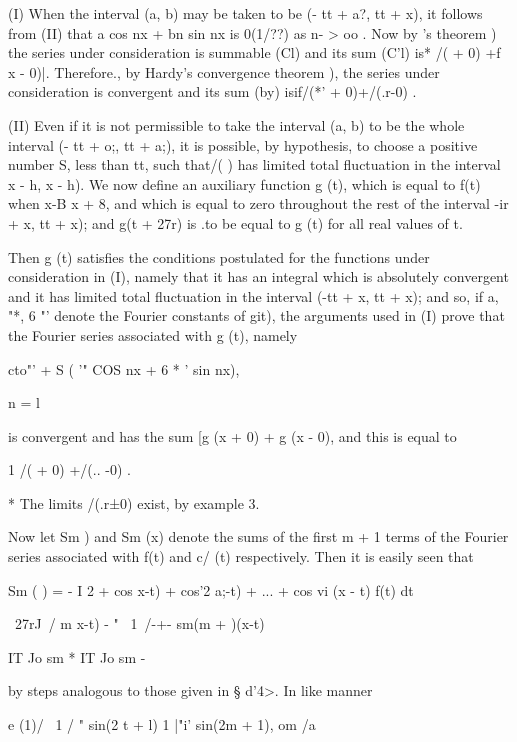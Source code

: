 (I) When the interval (a, b) may be taken to be (- tt + a?, tt + x),
it follows from (II) that a cos nx + bn sin nx is 0(1/??) as n-
> oo . Now by \Fejer's theorem ) the series under consideration
is summable (Cl) and its sum (C'l) is* /( + 0) +f x - 0)|. Therefore.,
by Hardy's convergence theorem ), the series under consideration
is convergent and its sum (by) isif/(*' + 0)+/(.r-0) .

(II) Even if it is not permissible to take the interval (a, b) to be
the whole interval (- tt + o;, tt + a;), it is possible, by
hypothesis, to choose a positive number S, less than tt, such that/( )
has limited total fluctuation in the interval x - h, x - h). We now
define an auxiliary function g (t), which is equal to f(t) when x-B%
x + 8, and which is equal to zero throughout the rest of the interval
-ir + x, tt + x); and g(t + 27r) is .to be equal to g (t) for all real
values of t.

Then g (t) satisfies the conditions postulated for the functions under
consideration in (I), namely that it has an integral which is
absolutely convergent and it has limited total fluctuation in the
interval (-tt + x, tt + x); and so, if a, "*, 6 "' denote the Fourier
constants of git), the arguments used in (I) prove that the Fourier
series associated with g (t), namely

  cto"' + S ( '" COS nx + 6 * ' sin nx),

n = l

is convergent and has the sum [g (x + 0) + g (x - 0), and this is
equal to

1 /( + 0) +/(.. -0) .

* The limits /(.r±0) exist, by example 3.

%
%

Now let Sm ) and Sm (x) denote the sums of the first m + 1 terms of
the Fourier series associated with f(t) and c/ (t) respectively. Then
it is easily seen that

Sm ( ) = - I 2 + cos x-t) + cos'2 a;-t) + ... + cos vi (x - t) f(t) dt

~27rJ\ / m x-t) - " \ 1\ /-+- sm(m + )(x-t)

IT Jo sm * IT Jo sm -

by steps analogous to those given in § d'4>. In like manner

e (1)/ \ 1 / " sin(2 t + l) 1 |"i' sin(2m + 1), om /a

